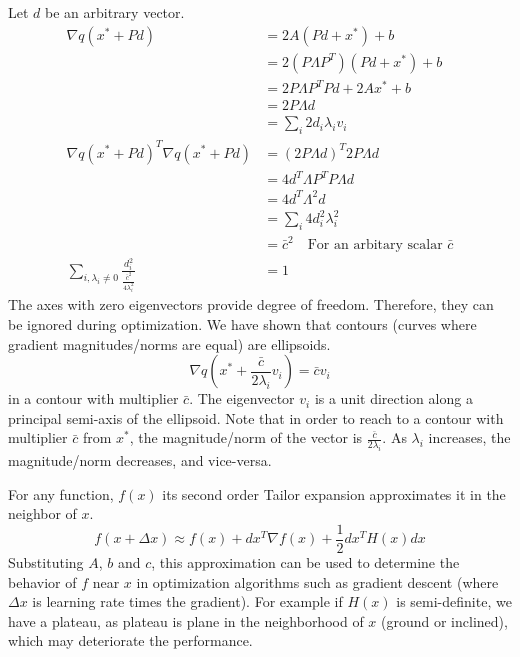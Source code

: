 \documentclass{book}
\numberwithin{equation}{subsection}
\begin{document}
Let $d$ be an arbitrary vector.
\begin{align}
    \nabla q(x^* + Pd) &= 2A(Pd + x^*)+b\\
    &= 2(P\Lambda P^T)(Pd + x^*)+b\\
    &= 2P\Lambda P^TPd + 2Ax^*+b\\
    &= 2P\Lambda d\\
    &= \sum_i 2d_i\lambda_i v_i\\
    \nabla q(x^*+Pd)^T \nabla q(x^*+Pd) &= (2P\Lambda d)^T2P\Lambda d\\
    &= 4d^T\Lambda P^TP\Lambda d\\
    &= 4d^T\Lambda^2 d\\
    &= \sum_i 4d_i^2  \lambda_i^2\\
    &= \bar{c}^2 \quad \text{For an arbitary scalar $\bar{c}$}\\
    \sum_{i,\lambda_i \neq 0} \frac{d_i^2}{\frac{\bar{c}^2}{4\lambda_i^2}} &= 1
\end{align}
The axes with zero eigenvectors provide degree of freedom. Therefore, they can be ignored during optimization. We have shown that contours (curves where gradient magnitudes/norms are equal) are ellipsoids.
\begin{equation}
    \nabla q(x^* + \frac{\bar{c}}{2\lambda_i}v_i) = \bar{c}v_i
\end{equation}
in a contour with multiplier $\bar{c}$. The eigenvector $v_i$ is a unit direction along a principal semi-axis of the ellipsoid. Note that in order to reach to a contour with multiplier $\bar{c}$ from $x^*$, the magnitude/norm of the vector is $\frac{\bar{c}}{2\lambda_i}$. As $\lambda_i$ increases, the magnitude/norm decreases, and vice-versa.

For any function, $f(x)$ its second order Tailor expansion approximates it in the neighbor of $x$.
\begin{equation}
    f(x+\Delta x) \approx f(x)+dx^T\nabla f(x)+\frac{1}{2}dx^TH(x)dx
\end{equation}
Substituting $A$, $b$ and $c$, this approximation can be used to determine the behavior of $f$ near $x$ in optimization algorithms such as gradient descent (where $\Delta x$ is learning rate times the gradient). For example if $H(x)$ is semi-definite, we have a plateau, as plateau is plane in the neighborhood of $x$ (ground or inclined), which may deteriorate the performance.
\end{document}
